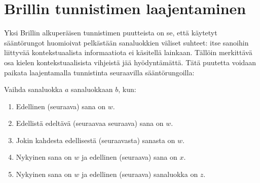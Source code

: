 \documentclass[utf8,bachelor,manualbib]{gradu3}
\begin{document}
\begin{comment}
\begin{table}[H]
\centering
\caption{10 ensimmäistä transformaatiosääntöä Penn Treebank-aineistolla harjoittaessa. Lähde: \citet{brill1995}}
\begin{tabular}{|c|c|c|c|}
\hline
\# & Mistä & Mihin & Ehto \\ \hline
1 & NN & VB & Edellinen sanaluokka on $TO$ \\
2 & VBP & VB & Jokin kolmesta edellisestä sanaluokasta on $MD$ \\
3 & NN & VB & Jokin kahdesta edellisestä sanaluokasta on $MD$ \\
4 & VB & NN & Jokin kahdesta edellisestä sanaluokasta on $DT$ \\
5 & VBD & VBN & Jokin kolmesta edellisestä sanaluokasta on $VBZ$ \\
6 & VBN & VBD & Edellinen sanaluokka on $PRP$ \\
7 & VBN & VBD & Edellinen sanaluokka on $NNP$ \\
8 & VBD & VBN & Edellinen sanaluokka on $VBD$ \\
9 & VBP & VB & Edellinen sanaluokka on $TO$ \\
10 & POS & VBZ & Edellinen sanaluokka on $PRP$ \\ \hline
\end{tabular}
\end{table}
\end{comment}

\section{Brillin tunnistimen laajentaminen}

Yksi Brillin alkuperäisen tunnistimen puutteista on se, että käytetyt sääntörungot huomioivat pelkästään sanaluokkien väliset suhteet: itse sanoihin liittyvää kontekstuaalista informaatiota ei käsitellä lainkaan. Tällöin merkittävä osa kielen kontekstuaalisista vihjeistä jää hyödyntämättä. Tätä puutetta voidaan paikata laajentamalla tunnistinta seuraavilla sääntörungoilla:

Vaihda sanaluokka $a$ sanaluokkaan $b$, kun:

\begin{enumerate}
\item Edellinen (seuraava) sana on $w$.
\item Edellistä edeltävä (seuraavaa seuraava) sana on $w$. 
\item Jokin kahdesta edellisestä (seuraavasta) sanasta on $w$.
\item Nykyinen sana on $w$ ja edellinen (seuraava) sana on $x$.
\item Nykyinen sana on $w$ ja edellinen (seuraava) sanaluokka on $z$.
\end{enumerate}
\end{document}
